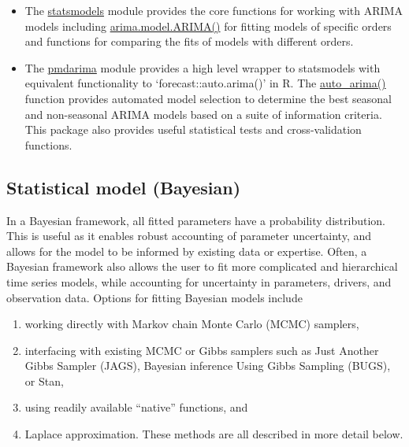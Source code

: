 \documentclass[
]{book}
\providecommand{\tightlist}{%
  \setlength{\itemsep}{0pt}\setlength{\parskip}{0pt}}
\begin{document}
\begin{itemize}
  \begin{itemize}
  \tightlist
  \item
    The \href{https://www.statsmodels.org/stable/index.html}{statsmodels} module provides the core functions for working with ARIMA models including \href{https://www.statsmodels.org/stable/generated/statsmodels.tsa.arima.model.ARIMA.html\#statsmodels.tsa.arima.model.ARIMA}{arima.model.ARIMA()} for fitting models of specific orders and functions for comparing the fits of models with different orders.\\
  \item
    The \href{https://pypi.org/project/pmdarima/}{pmdarima} module provides a high level wrapper to statsmodels with equivalent functionality to `forecast::auto.arima()' in R. The \href{https://alkaline-ml.com/pmdarima/modules/generated/pmdarima.arima.auto_arima.html?highlight=auto_arima}{auto\_arima()} function provides automated model selection to determine the best seasonal and non-seasonal ARIMA models based on a suite of information criteria. This package also provides useful statistical tests and cross-validation functions.
  \end{itemize}
\end{itemize}

\hypertarget{statistical-model-bayesian}{%
\subsection{Statistical model (Bayesian)}\label{statistical-model-bayesian}}

In a Bayesian framework, all fitted parameters have a probability distribution. This is useful as it enables robust accounting of parameter uncertainty, and allows for the model to be informed by existing data or expertise. Often, a Bayesian framework also allows the user to fit more complicated and hierarchical time series models, while accounting for uncertainty in parameters, drivers, and observation data. Options for fitting Bayesian models include

\begin{enumerate}
\def\labelenumi{\arabic{enumi}.}
\tightlist
\item
  working directly with Markov chain Monte Carlo (MCMC) samplers,
\item
  interfacing with existing MCMC or Gibbs samplers such as Just Another Gibbs Sampler (JAGS), Bayesian inference Using Gibbs Sampling (BUGS), or Stan,
\item
  using readily available ``native'' functions, and
\item
  Laplace approximation.
  These methods are all described in more detail below.
\end{enumerate}
\end{document}
